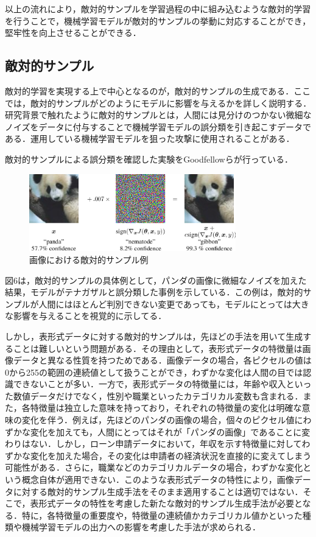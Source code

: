 以上の流れにより，敵対的サンプルを学習過程の中に組み込むような敵対的学習を行うことで，機械学習モデルが敵対的サンプルの挙動に対応することができ，堅牢性を向上させることができる．

\subsection{敵対的サンプル}
敵対的学習を実現する上で中心となるのが，敵対的サンプルの生成である．ここでは，敵対的サンプルがどのようにモデルに影響を与えるかを詳しく説明する．
研究背景で触れたように敵対的サンプルとは，人間には見分けのつかない微細なノイズをデータに付与することで機械学習モデルの誤分類を引き起こすデータである．\cite{MBSD-AdversarialExample}運用している機械学習モデルを狙った攻撃に使用されることがある．

敵対的サンプルによる誤分類を確認した実験をGoodfellowらが行っている\cite{goodfellow2015explaining}．
\begin{figure}[H]
    \centering
    \includegraphics[width=0.8\textwidth]{images/goodfellow_panda.png}
    \caption{画像における敵対的サンプル例\cite{goodfellow2015explaining}}
    \label{fig:adversarial_example}
\end{figure}

図6は，敵対的サンプルの具体例として，パンダの画像に微細なノイズを加えた結果，モデルがテナガザルと誤分類した事例を示している．この例は，敵対的サンプルが人間にはほとんど判別できない変更であっても，モデルにとっては大きな影響を与えることを視覚的に示してる．

しかし，表形式データに対する敵対的サンプルは，先ほどの手法を用いて生成することは難しいという問題がある．その理由として，表形式データの特徴量は画像データと異なる性質を持つためである．画像データの場合，各ピクセルの値は0から255の範囲の連続値として扱うことができ，わずかな変化は人間の目では認識できないことが多い．一方で，表形式データの特徴量には，年齢や収入といった数値データだけでなく，性別や職業といったカテゴリカル変数も含まれる．また，各特徴量は独立した意味を持っており，それぞれの特徴量の変化は明確な意味の変化を伴う．例えば，先ほどのパンダの画像の場合，個々のピクセル値にわずかな変化を加えても，人間にとってはそれが「パンダの画像」であることに変わりはない．しかし，ローン申請データにおいて，年収を示す特徴量に対してわずかな変化を加えた場合，その変化は申請者の経済状況を直接的に変えてしまう可能性がある．さらに，職業などのカテゴリカルデータの場合，わずかな変化という概念自体が適用できない．このような表形式データの特性により，画像データに対する敵対的サンプル生成手法をそのまま適用することは適切ではない．そこで，表形式データの特性を考慮した新たな敵対的サンプル生成手法が必要となる．特に，各特徴量の重要度や，特徴量の連続値かカテゴリカル値かといった種類や機械学習モデルの出力への影響を考慮した手法が求められる．


